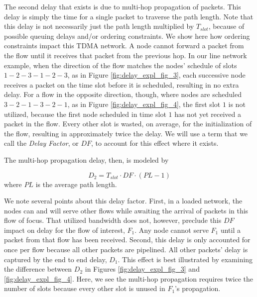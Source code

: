 The second delay that exists is due to multi-hop propagation of packets.  This delay is simply the time for a single packet to traverse the path length.  Note that this delay is not necessarily just the path length multiplied by $T_{slot}$, because of possible queuing delays and/or ordering constraints.  We show here how ordering constraints impact this TDMA network.  A node cannot forward a packet from the flow until it receives that packet from the previous hop.  In our line network example, when the direction of the flow matches the nodes' schedule of slots $1-2-3-1-2-3$, as in Figure \ref{fig:delay_expl_fig_3}, each successive node receives a packet on the time slot before it is scheduled, resulting in no extra delay.  For a flow in the opposite direction, though, where nodes are scheduled $3-2-1-3-2-1$, as in Figure \ref{fig:delay_expl_fig_4}, the first slot $1$ is not utilized, because the first node scheduled in time slot $1$ has not yet received a packet in the flow.  Every other slot is wasted, on average, for the initialization of the flow, resulting in approximately twice the delay.  We will use a term that we call the \emph{Delay Factor}, or $DF$, to account for this effect where it exists.

The multi-hop propagation delay, then, is modeled by

\begin{equation}
	D_2 = T_{slot} \cdot DF \cdot (PL - 1)
\end{equation}
where $PL$ is the average path length.

We note several points about this delay factor.  First, in a loaded network, the nodes can and will serve other flows while awaiting the arrival of packets in this flow of focus.  That utilized bandwidth does not, however, preclude this $DF$ impact on delay for the flow of interest, $F_1$.  Any node cannot serve $F_1$ until a packet from that flow has been received.  Second, this delay is only accounted for once per flow because all other packets are pipelined.  All other packets' delay is captured by the end to end delay, $D_1$.  This effect is best illustrated by examining the difference between $D_2$ in Figures \ref{fig:delay_expl_fig_3} and \ref{fig:delay_expl_fig_4}.  Here, we see the multi-hop propagation requires twice the number of slots because every other slot is unused in $F_1$'s propagation.  

